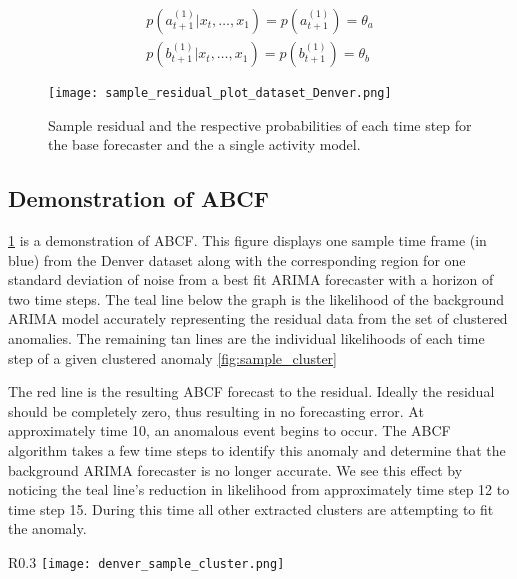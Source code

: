 \begin{equation}
	\begin{split}
		p(a_{t + 1}^{(1)}|x_{t}, \ldots, x_{1}) = p(a_{t + 1}^{(1)}) = \theta_a \\
		p(b_{t + 1}^{(1)}|x_{t}, \ldots, x_{1}) = p(b_{t + 1}^{(1)}) = \theta_b
	\end{split}
\end{equation}



\begin{figure}[!t]
	\begin{center}
		\texttt{[image: sample\_residual\_plot\_dataset\_Denver.png]}
	\end{center}
	\caption{Sample residual and the respective probabilities of each time step for the base forecaster and the a single activity model.}
	\label{fig:sample_abcf_residual}
\end{figure}

\subsection{Demonstration of ABCF}
\ref{fig:sample_abcf_residual} is a demonstration of ABCF.  This figure displays one sample time frame (in blue) from the Denver dataset along with the corresponding region for one standard deviation of noise from a best fit ARIMA forecaster with a horizon of two time steps.  The teal line below the graph is the likelihood of the background ARIMA model accurately representing the residual data from the set of clustered anomalies.  The remaining tan lines are the individual likelihoods of each time step of a given clustered anomaly \ref{fig:sample_cluster}  

The red line is the resulting ABCF forecast to the residual.  Ideally the residual should be completely zero, thus resulting in no forecasting error.  At approximately time 10, an anomalous event begins to occur.  The ABCF algorithm takes a few time steps to identify this anomaly and determine that the background ARIMA forecaster is no longer accurate.  We see this effect by noticing the teal line's reduction in likelihood from approximately time step 12 to time step 15.  During this time all other extracted clusters are attempting to fit the anomaly.

\begin{wrapfigure}{R}{0.3\textwidth}
\centering
\texttt{[image: denver\_sample\_cluster.png]}
\caption{Extracted sample clustered anomaly.}
\label{fig:sample_cluster}
\end{wrapfigure}

